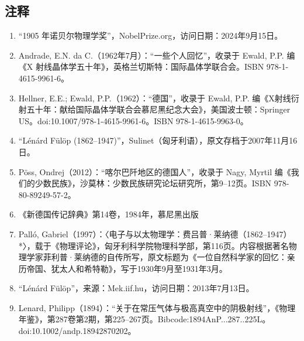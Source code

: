 \subsection{注释}
\begin{enumerate}
\item  “1905 年诺贝尔物理学奖”，NobelPrize.org，访问日期：2024年9月15日。
\item  Andrade, E.N. da C.（1962年7月）：“一些个人回忆”，收录于 Ewald, P.P. 编《X 射线晶体学五十年》，英格兰切斯特：国际晶体学联合会。ISBN 978-1-4615-9961-6。
\item  Hellner, E.E.; Ewald, P.P.（1962）：“德国”，收录于 Ewald, P.P. 编《X射线衍射五十年：献给国际晶体学联合会慕尼黑纪念大会》，美国波士顿：Springer US。doi:10.1007/978-1-4615-9961-6。ISBN 978-1-4615-9963-0。
\item “Lénárd Fülöp (1862–1947)”，Sulinet（匈牙利语），原文存档于2007年11月16日。
\item  Pöss, Ondrej（2012）：“喀尔巴阡地区的德国人”，收录于 Nagy, Myrtil 编《我们的少数民族》，沙莫林：少数民族研究论坛研究所，第9–12页。ISBN 978-80-89249-57-2。
\item 《新德国传记辞典》第14卷，1984年，慕尼黑出版
\item Palló, Gabriel（1997）：〈电子与以太物理学：费吕普·莱纳德（1862–1947）*〉，载于《物理评论》，匈牙利科学院物理科学部，第116页。内容根据著名物理学家菲利普·莱纳德的自传所写，原文标题为《一位自然科学家的回忆：亲历帝国、犹太人和希特勒》，写于1930年9月至1931年3月。
\item “Lénárd Fülöp”，来源：Mek.iif.hu，访问日期：2013年7月13日。
\item Lenard, Philipp（1894）：“关于在常压气体与极高真空中的阴极射线”，《物理年鉴》，第287卷第2期，第225–267页。Bibcode:1894AnP...287..225L。doi:10.1002/andp.18942870202。

\end{enumerate}

